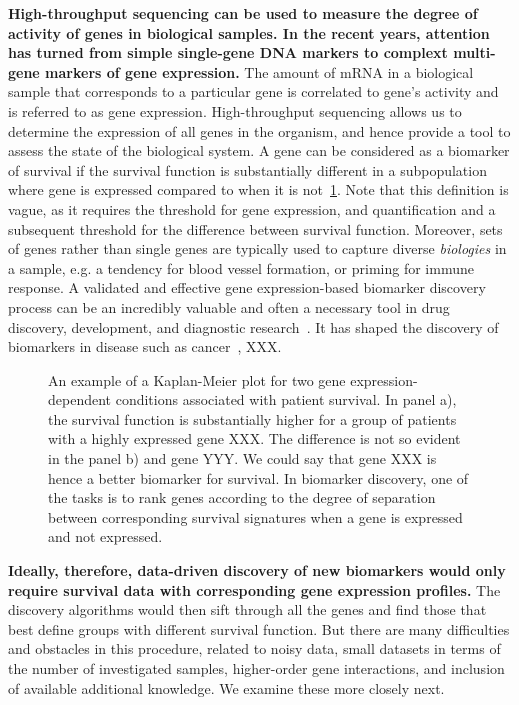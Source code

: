 \documentclass[11pt,a4paper]{article}
\renewcommand{\bold}{\textbf}
\begin{document}
\bold{High-throughput sequencing can be used to measure the degree of activity of genes in biological samples. In the recent years, attention has turned from simple single-gene DNA markers to complext multi-gene markers of gene expression.} The amount of mRNA in a biological sample that corresponds to a particular gene is correlated to gene's activity and is referred to as gene expression. High-throughput sequencing allows us to determine the expression of all genes in the organism, and hence provide a tool to assess the state of the biological system. A gene can be considered as a biomarker of survival if the survival function is substantially different in a subpopulation where gene is expressed compared to when it is not~\ref{fig:km-marker}. Note that this definition is vague, as it requires the threshold for gene expression, and quantification and a subsequent threshold for the difference between survival function. Moreover, sets of genes rather than single genes are typically used to capture diverse {\em biologies} in a sample, e.g. a tendency for blood vessel formation, or priming for immune response. A validated and effective gene expression-based biomarker discovery process can be an incredibly valuable and often a necessary tool in drug discovery, development, and diagnostic research~\cite{MonforteMcPhail2005}. It has shaped the discovery of biomarkers in disease such as cancer~\cite{HENRY2012140}, XXX.

\begin{figure}
\caption{An example of a Kaplan-Meier plot for two gene expression-dependent conditions associated with patient survival. In panel a), the survival function is substantially higher for a group of patients with a highly expressed gene XXX. The difference is not so evident in the panel b) and gene YYY. We could say that gene XXX is hence a better biomarker for survival. In biomarker discovery, one of the tasks is to rank genes according to the degree of separation between corresponding survival signatures when a gene is expressed and not expressed.}
\label{fig:km-marker}
\end{figure}

\bold{ Ideally, therefore, data-driven discovery of new biomarkers would only require survival data with corresponding gene expression profiles.} The discovery algorithms would then sift through all the genes and find those that best define groups with different survival function. But there are many difficulties and obstacles in this procedure, related to noisy data, small datasets in terms of the number of investigated samples, higher-order gene interactions, and inclusion of available additional knowledge. We examine these more closely next.
\end{document}
